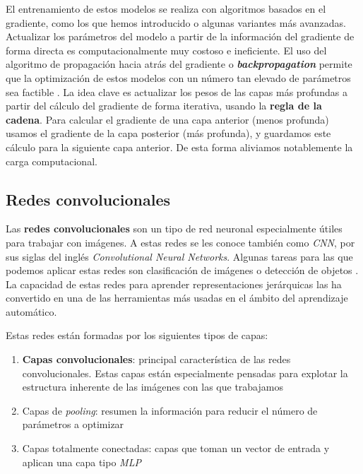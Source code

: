 El entrenamiento de estos modelos se realiza con algoritmos basados en el gradiente, como los que hemos introducido o algunas variantes más avanzadas. Actualizar los parámetros del modelo a partir de la información del gradiente de forma directa es computacionalmente muy costoso e ineficiente. El uso del algoritmo de propagación hacia atrás del gradiente o \textbf{\textit{backpropagation}} permite que la optimización de estos modelos con un número tan elevado de parámetros sea factible \cite{informatica:libro_backprop}. La idea clave es actualizar los pesos de las capas más profundas a partir del cálculo del gradiente de forma iterativa, usando la \textbf{regla de la cadena}. Para calcular el gradiente de una capa anterior (menos profunda) usamos el gradiente de la capa posterior (más profunda), y guardamos este cálculo para la siguiente capa anterior. De esta forma aliviamos notablemente la carga computacional.

\subsection{Redes convolucionales}

Las \textbf{redes convolucionales} son un tipo de red neuronal especialmente útiles para trabajar con imágenes. A estas redes se les conoce también como \textit{CNN}, por sus siglas del inglés \textit{Convolutional Neural Networks}. Algunas tareas para las que podemos aplicar estas redes son clasificación de imágenes o detección de objetos \cite{informatica:paper_definicion_cnn}. La capacidad de estas redes para aprender representaciones jerárquicas las ha convertido en una de las herramientas más usadas en el ámbito del aprendizaje automático.

Estas redes están formadas por los siguientes tipos de capas:

\begin{enumerate}
    \item \textbf{Capas convolucionales}: principal característica de las redes convolucionales. Estas capas están especialmente pensadas para explotar la estructura inherente de las imágenes con las que trabajamos
    \item Capas de \textit{pooling}: resumen la información para reducir el número de parámetros a optimizar
    \item Capas totalmente conectadas: capas que toman un vector de entrada y aplican una capa tipo \textit{MLP} 
\end{enumerate}

